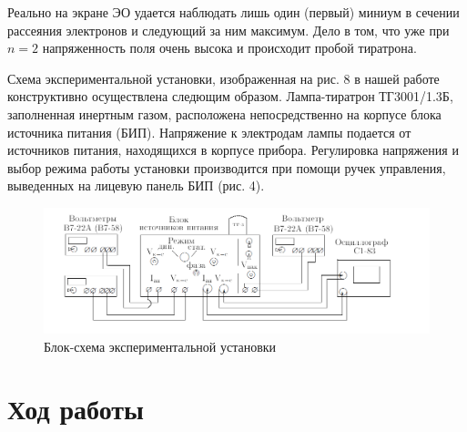 \documentclass[a4paper,12pt]{article}
\theoremstyle{plain} %
\theoremstyle{definition} %
\theoremstyle{remark} %
\begin{document}
Реально на экране ЭО удается наблюдать лишь один (первый) миниум в сечении рассеяния электронов и следующий за ним максимум. Дело в том, что уже при $n = 2$ напряженность поля очень высока и происходит пробой тиратрона. 

Схема экспериментальной установки, изображенная на рис. 8 в нашей работе конструктивно осуществлена следющим образом. Лампа-тиратрон ТГ3001/1.3Б, заполненная инертным газом, расположена непосредственно на корпусе блока источника питания (БИП). Напряжение к электродам лампы подается от источников питания, находящихся в корпусе прибора. Регулировка напряжения и выбор режима работы установки производится при помощи ручек управления, выведенных на лицевую панель БИП (рис. 4).
\begin{figure}[h]
    \begin{center}
        \includegraphics[width= \textwidth]{pic4.png}
    \end{center}
    \caption{Блок-схема экспериментальной установки}
\end{figure}
\newpage
\section{Ход работы}
\end{document}
